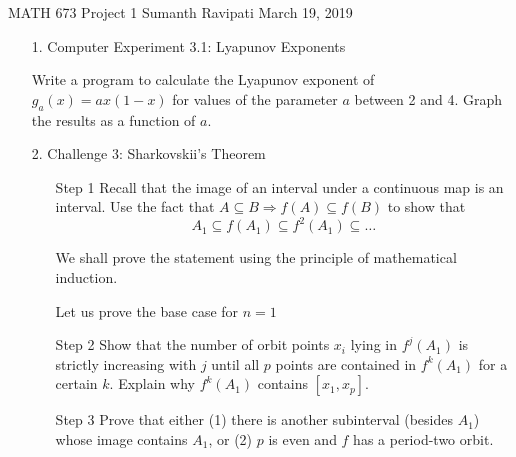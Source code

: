 \documentclass[12pt,letterpaper,reqno]{amsart}
\begin{document}
\thispagestyle{empty}
\begin{center}\large{
    MATH 673\quad
    Project 1\quad
    Sumanth Ravipati\quad
    March 19, 2019}
\end{center}
\vspace{.25in}

\begin{enumerate}
\item[1.] Computer Experiment 3.1: Lyapunov Exponents\newline

Write a program to calculate the Lyapunov exponent of $g_a(x) = ax(1-x)$ for values of the parameter $a$ between 2 and 4. Graph the results as a function of $a$.

\begin{flushleft}

\end{flushleft}

\newpage
\item[2.] Challenge 3: Sharkovskii's Theorem\newline

\begin{enumerate}
    \item[Step 1] Recall that the image of an interval under a continuous map is an interval. Use the fact that $A \subseteq B \Rightarrow f(A) \subseteq f(B)$ to show that
    $$A_1 \subseteq f(A_1) \subseteq f^2(A_1) \subseteq \ldots$$
    \newline
    \begin{flushleft}
    
    We shall prove the statement using the principle of mathematical induction.\newline
    
    Let us prove the base case for $n = 1$
    \end{flushleft}

    \item[Step 2] Show that the number of orbit points $x_i$ lying in $f^j(A_1)$ is strictly increasing with $j$ until all $p$ points are contained in $f^k(A_1)$ for a certain $k$. Explain why $f^k(A_1)$ contains $[x_1, x_p]$.
    \begin{flushleft}
    
    \end{flushleft}
    
    \item[Step 3] Prove that either (1) there is another subinterval (besides $A_1$) whose image contains $A_1$, or (2) $p$ is even and $f$ has a period-two orbit.
    \begin{flushleft}
    

\end{flushleft}
\end{enumerate}
\end{enumerate}
\end{document}
